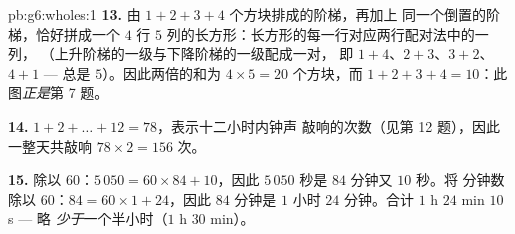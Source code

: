 \begin{solution}{pb:g6:wholes:1}
\textbf{13.} 由 $1 + 2 + 3 + 4$ 个方块排成的阶梯，再加上
同一个倒置的阶梯，恰好拼成一个 $4$ 行 $5$
列的长方形：长方形的每一行对应两行配对法中的一列，
（上升阶梯的一级与下降阶梯的一级配成一对，
即 $1 + 4$、$2 + 3$、$3 + 2$、$4 + 1$ ---
总是 $5$）。因此两倍的和为 $4 \times 5 = 20$ 个方块，而
$1 + 2 + 3 + 4 = 10$：此图\emph{正是}第 7 题。

\textbf{14.} $1 + 2 + \dots + 12 = 78$，表示十二小时内钟声
敲响的次数（见第 12 题），因此一整天共敲响 $78 \times 2 = 156$ 次。

\textbf{15.} 除以 $60$：$5\,050 = 60 \times 84 + 10$，因此
$5\,050$ 秒是 $84$ 分钟又 $10$ 秒。将
分钟数除以 $60$：$84 = 60 \times 1 + 24$，因此 $84$ 分钟是
$1$ 小时 $24$ 分钟。合计 $1$ h $24$ min $10$ s --- 略
\emph{少于}一个半小时（$1$ h $30$ min）。
\end{solution}
